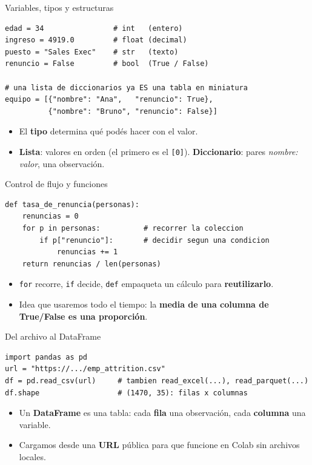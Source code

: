 \documentclass[aspectratio=169,xcolor=dvipsnames]{beamer}
\begin{document}
\begin{frame}[fragile]{Variables, tipos y estructuras}
\begin{lstlisting}
edad = 34                # int   (entero)
ingreso = 4919.0         # float (decimal)
puesto = "Sales Exec"    # str   (texto)
renuncio = False         # bool  (True / False)

# una lista de diccionarios ya ES una tabla en miniatura
equipo = [{"nombre": "Ana",   "renuncio": True},
          {"nombre": "Bruno", "renuncio": False}]
\end{lstlisting}
    \begin{itemize}
        \item El \textbf{tipo} determina qu\'e pod\'es hacer con el valor.
        \item \textbf{Lista}: valores en orden (el primero es el \texttt{[0]}). \textbf{Diccionario}: pares \emph{nombre: valor}, una observaci\'on.
    \end{itemize}
\end{frame}

\begin{frame}[fragile]{Control de flujo y funciones}
\begin{lstlisting}
def tasa_de_renuncia(personas):
    renuncias = 0
    for p in personas:          # recorrer la coleccion
        if p["renuncio"]:       # decidir segun una condicion
            renuncias += 1
    return renuncias / len(personas)
\end{lstlisting}
    \begin{itemize}
        \item \texttt{for} recorre, \texttt{if} decide, \texttt{def} empaqueta un c\'alculo para \textbf{reutilizarlo}.
        \item Idea que usaremos todo el tiempo: la \textbf{media de una columna de True/False es una proporci\'on}.
    \end{itemize}
\end{frame}

\begin{frame}[fragile]{Del archivo al DataFrame}
\begin{lstlisting}
import pandas as pd
url = "https://.../emp_attrition.csv"
df = pd.read_csv(url)     # tambien read_excel(...), read_parquet(...)
df.shape                  # (1470, 35): filas x columnas
\end{lstlisting}
    \begin{itemize}
        \item Un \textbf{DataFrame} es una tabla: cada \textbf{fila} una observaci\'on, cada \textbf{columna} una variable.
        \item Cargamos desde una \textbf{URL} p\'ublica para que funcione en Colab sin archivos locales.
    \end{itemize}
\end{frame}
\end{document}

